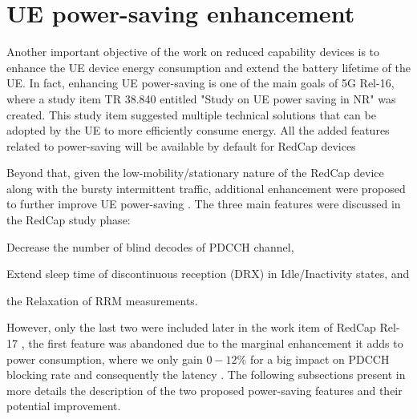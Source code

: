 \documentclass[conference]{IEEEtran}
\begin{document}
\section{UE power-saving enhancement}
\label{sec:5-power-saving}






Another important objective of the work on reduced capability devices is to enhance the UE device energy consumption and extend the battery lifetime of the UE. In fact, enhancing UE power-saving is one of the main goals of 5G Rel-16, where a study item TR 38.840 \cite{3gpp.38.840} entitled "Study on UE power saving in NR" was created. This study item suggested multiple technical solutions that can be adopted by the UE to more efficiently consume energy. All the added features related to power-saving will be available by default for RedCap devices

Beyond that, given the low-mobility/stationary nature of the RedCap device along with the bursty intermittent traffic, additional enhancement were proposed to further improve UE power-saving . The three main features were discussed in the RedCap study phase:
\begin{enumerate*}
    \item Decrease the number of blind decodes of PDCCH channel,
    \item Extend sleep time of discontinuous reception (DRX) in Idle/Inactivity states, and
    \item the Relaxation of RRM measurements. 
\end{enumerate*}
However, only the last two were included later in the work item of RedCap Rel-17 \cite{3gpp_revised_2022-1_RP-220966}, the first feature was abandoned due to the marginal enhancement it adds to power consumption, where we only gain $0-12\%$ for a big impact on PDCCH blocking rate and consequently the latency \cite{ratasuk_reduced_2021}. The following subsections present in more details the description of the two proposed power-saving features and their potential improvement.
\end{document}
